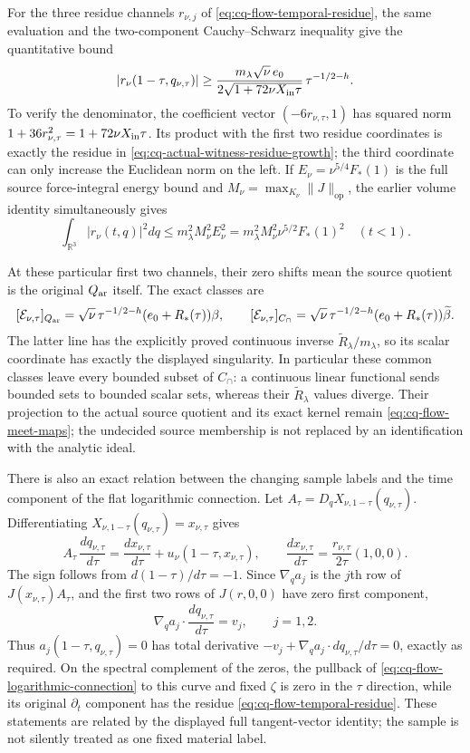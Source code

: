For the three residue channels $r_{\nu,j}$ of
\eqref{eq:cq-flow-temporal-residue}, the same evaluation and the
two-component Cauchy--Schwarz inequality give the quantitative bound
\begin{equation}
 |r_\nu(1-\tau,q_{\nu,\tau})|
 \geq
 \frac{m_\lambda\sqrt\nu\,e_0}
             {2\sqrt{1+72\nu X_{\rm in}\tau}}\,
                   \tau^{-1/2-h}.
 \label{eq:cq-actual-witness-residue-vector-growth}
\end{equation}
To verify the denominator, the coefficient vector
$(-6r_{\nu,\tau},1)$ has squared norm
$1+36r_{\nu,\tau}^2=1+72\nu X_{\rm in}\tau$.
Its product with the first two residue coordinates is exactly
the residue in \eqref{eq:cq-actual-witness-residue-growth}; the
third coordinate can only increase the Euclidean norm on the left.
If $E_\nu=\nu^{5/4}F_*(1)$ is the full source force-integral energy
bound and $M_\nu=\max_{K_\nu}\|J\|_{\mathrm{op}}$, the earlier
volume identity simultaneously gives
\[
 \int_{\mathbb R^3}|r_\nu(t,q)|^2dq
 \leq m_\lambda^2M_\nu^2E_\nu^2
 =m_\lambda^2M_\nu^2\nu^{5/2}F_*(1)^2\quad(t<1).
\]

At these particular first two channels, their zero shifts mean the
source quotient is the original $Q_{\rm ar}$ itself. The exact classes are
\[
 [\mathcal E_{\nu,\tau}]_{Q_{\rm ar}}
 =\sqrt\nu\,\tau^{-1/2-h}(e_0+R_*(\tau))\beta,\qquad
 [\mathcal E_{\nu,\tau}]_{C_\cap}
 =\sqrt\nu\,\tau^{-1/2-h}(e_0+R_*(\tau))\widetilde\beta.
\]
The latter line has the explicitly proved continuous inverse
$\widetilde R_\lambda/m_\lambda$, so its scalar coordinate has
exactly the displayed singularity. In particular these common
classes leave every bounded subset of $C_\cap$: a continuous linear
functional sends bounded sets to bounded scalar sets, whereas their
$\widetilde R_\lambda$ values diverge. Their projection to the
actual source quotient and its exact kernel remain
\eqref{eq:cq-flow-meet-maps}; the undecided source membership is
not replaced by an identification with the analytic ideal.

There is also an exact relation between the changing sample labels
and the time component of the flat logarithmic connection.
Let $A_\tau=D_qX_{\nu,1-\tau}(q_{\nu,\tau})$. Differentiating
$X_{\nu,1-\tau}(q_{\nu,\tau})=x_{\nu,\tau}$ gives
\[
 A_\tau\,\frac{dq_{\nu,\tau}}{d\tau}
 =\frac{dx_{\nu,\tau}}{d\tau}
       +u_\nu(1-\tau,x_{\nu,\tau}),\qquad
 \frac{dx_{\nu,\tau}}{d\tau}
       =\frac{r_{\nu,\tau}}{2\tau}(1,0,0).
\]
The sign follows from $d(1-\tau)/d\tau=-1$.
Since $\nabla_q a_j$ is the $j$th row of $J(x_{\nu,\tau})A_\tau$,
and the first two rows of $J(r,0,0)$ have zero first component,
\[
 \nabla_q a_j\cdot\frac{dq_{\nu,\tau}}{d\tau}=v_j,\qquad j=1,2.
\]
Thus $a_j(1-\tau,q_{\nu,\tau})=0$ has total derivative
$-v_j+\nabla_q a_j\cdot dq_{\nu,\tau}/d\tau=0$, exactly as required.
On the spectral complement of the zeros, the pullback of
\eqref{eq:cq-flow-logarithmic-connection} to this curve and fixed
$\zeta$ is zero in the $\tau$ direction, while its original
$\partial_t$ component has the residue
\eqref{eq:cq-flow-temporal-residue}. These statements are related
by the displayed full tangent-vector identity; the sample is not
silently treated as one fixed material label.

